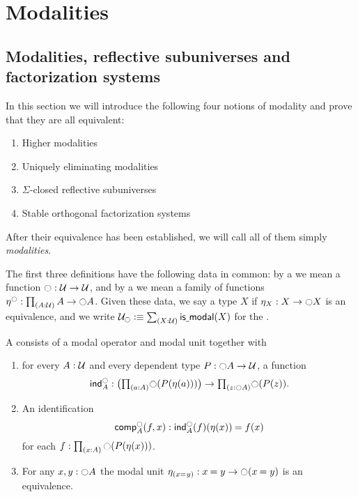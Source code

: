 \chapter{Modalities}

\section{Modalities, reflective subuniverses and factorization systems}\label{sec:modal-refl-subun}

In this section we will introduce the following four notions of modality
and prove that they are all equivalent:
\begin{enumerate}
\item Higher modalities
\item Uniquely eliminating modalities
\item $\Sigma$-closed reflective subuniverses
\item Stable orthogonal factorization systems
\end{enumerate}
After their equivalence has been established, we will call all of them simply \emph{modalities}.

The first three definitions have the following data in common: by a  we mean a function $\modal:\UU\to\UU$, and by a  we mean a family of functions $\modalunit^\modal:\prd*{A:\UU}A\to\modal A$.
Given these data, we say a type $X$  if $\modalunit[X]:X\to\modal X$ is an equivalence, and we write $\UU_\modal \defeq \sm{X:\UU} \ismodal(X)$ for the .

\begin{defn}\label{defn:highermod}
A  consists of a modal operator and modal unit together with
\begin{enumerate}
\item for every $A:\UU$ and every dependent type $P:\modal A\to\UU$, a
function
\begin{equation*}
\mathsf{ind}^\modal_A:\big(\prd{a:A}\modal(P(\eta(a)))\big)\to\prd{z:\modal A}\modal(P(z)).
\end{equation*}
\item An identification
\begin{equation*}
\mathsf{comp}^\modal_A(f,x):\id{\mathsf{ind}^\modal_A(f)(\eta(x))}{f(x)}
\end{equation*}
for each $f:\prd{x:A}\modal(P(\eta(x)))$.
\item For any $x,y:\modal A$ the modal unit $\modalunit[(\id{x}{y})]:\id{x}{y}\to \modal(\id{x}{y})$ is an equivalence.
\end{enumerate}
\end{defn}

